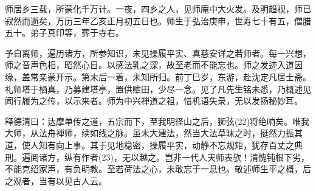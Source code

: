 \documentclass[12pt,twoside,openany]{book}
\begin{document}
师居乡三载，所蒙化千万计。一夜，四乡之人，见师庵中大火发。及明趋视，师已寂然而逝矣，万历三年乙亥正月初五日也。师生于弘治庚申，世寿七十有五，僧腊五十。弟子真印等，葬于寺右。

予自离师，遍历诸方，所参知识，未见操履平实、真慈安详之若师者。每一兴想，师之音声色相，昭然心目。以感法乳之深，故至老而不能忘也。师之发迹入道因缘，盖常亲蒙开示。第末后一着，未知所归。前丁巳岁，东游，赴沈定凡居士斋。礼师塔于栖真，乃募建塔亭，置供赡田，少尽一念。见了凡先生铭未悉，乃概述见闻行履为之传，以示来者。师为中兴禅道之祖，惜机语失录，无以发扬秘妙耳。

释德清曰：达摩单传之道，五宗而下，至我明径山之后，狮弦(22)将绝响矣。唯我大师，从法舟禅师，续如线之脉。虽未大建法，然当大法草昧之时，挺然力振其道，使人知有向上事。其于见地稳密，操履平实，动静不忘规矩，犹存百丈之典刑。遍阅诸方，纵有作者(23)，无以越之。岂非一代人天师表欤！清愧钝根下劣，不能克绍家声，有负明教。至若荷法之心，未敢忘于一息也。敬述师生平之概，后之观者，当有以见古人云。
\end{document}
